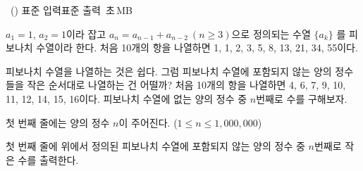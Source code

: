 \begin{problem}{\kcpcpprobnotfibo\ (\kcpcpprobnotfiboshort)}
    {표준 입력}{표준 출력}
    {\kcpcpprobnotfibotime\,초}{\kcpcpprobnotfibomemory\,MB}{}
    
    $ a_1 = 1 $, $ a_2 = 1 $이라 잡고 $ a_n = a_{n-1} + a_{n-2}\ (n \geq 3) $으로 정의되는 수열 $ \{a_k\} $ 를 피보나치 수열이라 한다. 처음 10개의 항을 나열하면 1, 1, 2, 3, 5, 8, 13, 21, 34, 55이다.
    
    피보나치 수열을 나열하는 것은 쉽다. 그럼 피보나치 수열에 포함되지 않는 양의 정수들을 작은 순서대로 나열하는 건 어떨까? 처음 10개의 항을 나열하면 4, 6, 7, 9, 10, 11, 12, 14, 15, 16이다. 피보나치 수열에 없는 양의 정수 중 $ n $번째로 수를 구해보자.
    
    \InputFile
    
    첫 번째 줄에는 양의 정수 $ n $이 주어진다. ($ 1 \leq n \leq 1,000,000 $)
    
    \OutputFile
    
    첫 번째 줄에 위에서 정의된 피보나치 수열에 포함되지 않는 양의 정수 중 $ n $번째로 작은 수를 출력한다.
    
    \Examples
    \begin{example}
    \end{example}
    
\end{problem}

